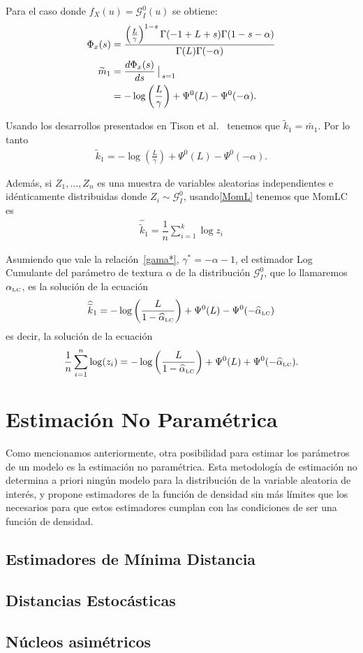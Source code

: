 Para el caso donde $f_X(u) = \mathcal{G}_I^0(u)$ se obtiene:
	\begin{align}
	\Phi_x(s) &= \dfrac{\left(\frac{L}{\gamma}\right)^{1-s}\Gamma(-1+L+s)\Gamma(1-s-\alpha)}{\Gamma(L)\Gamma(-\alpha)} \\
	\vspace{1cm}
	\nonumber \widetilde{m}_1 &=  \frac{d \Phi_x(s)}{ds } \big\arrowvert _{s=1}\\
					& = -\log\left(\frac{L}{\gamma}\right) + \Psi^0(L) - \Psi^0(-\alpha).
	\end{align}

Usando los desarrollos presentados en Tison et al.~\cite{Tison2004} tenemos que $\widetilde{k}_1 = \widetilde{m_1}$. Por lo tanto 
\begin{align}
\label{MomLC}
\widetilde{k}_1 =   -\log \left(\frac{L}{\gamma}\right) + \Psi^0(L) - \Psi^0(-\alpha).
\end{align}

Además, si $Z_1,\ldots,Z_n$ es una muestra de variables aleatorias independientes e idénticamente distribuidas donde $Z_i \sim \mathcal{G}_I^0$, usando\eqref{MomL} tenemos que MomLC es
\begin{align}
\label{EstimadorMomLC}
\widehat{\widetilde{k}}_1 =\dfrac{1}{n} \sum_{i=1}^k\log z_i
\end{align}

Asumiendo que vale la relación~\eqref{gama*}, $\gamma^*=-\alpha-1$, el estimador Log Cumulante del parámetro de textura $\alpha$ de la distribución $\mathcal{G}_I^0$, que lo llamaremos $\alpha_{\text{\tiny{LC}}}$, es la solución de la ecuación    
\begin{align}
\widehat{\widetilde{k}}_1 =   -\log \left(\frac{L}{1-\widehat\alpha_{\text{\tiny{LC}}}}\right) + \Psi^0(L) - \Psi^0(-\widehat\alpha_{\text{\tiny{LC}}})
\end{align}
es decir, la solución de la ecuación
\begin{equation} \label{eq:logm}
\frac{1}{n} \sum_{i=1}^n\log (z_i) =   -\log \left(\frac{L}{1-\widehat\alpha_{\text{\tiny{LC}}}}\right) + \Psi^0(L) + \Psi^0(-\widehat\alpha_{\text{\tiny{LC}}}).
\end{equation}


\section{Estimación No Paramétrica}

Como mencionamos anteriormente, otra posibilidad para estimar los parámetros de un modelo es la estimación no paramétrica. Esta metodología de estimación  no determina a priori ningún modelo para la distribución de la variable aleatoria de interés, y propone estimadores de la función de densidad sin más límites que los necesarios para que estos estimadores cumplan con las condiciones de ser una función de densidad.

\subsection{Estimadores de Mínima Distancia}
\subsection{Distancias Estocásticas}
\subsection{Núcleos asimétricos}

